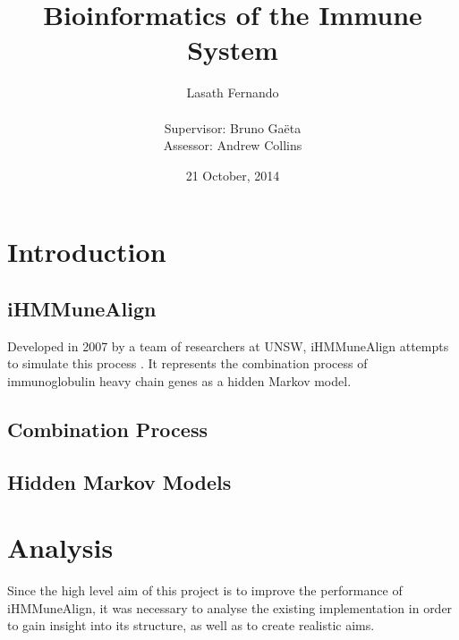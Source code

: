 \documentclass[a4paper,12pt]{report}
\author{Lasath Fernando\\\\
Supervisor: Bruno Ga\"{e}ta\\
Assessor: Andrew Collins}
\title{Bioinformatics of the Immune System}
\date{21 October, 2014}
\begin{document}
\maketitle

\tableofcontents

\chapter{Introduction}

\section{iHMMuneAlign}
Developed in 2007 by a team of researchers at UNSW, iHMMuneAlign attempts to simulate this process \autocite{iHMMuneAlign}.
It represents the combination process of immunoglobulin heavy chain genes as a hidden Markov model.

\section{Combination Process}
\section{Hidden Markov Models}

\chapter{Analysis}
Since the high level aim of this project is to improve the performance of iHMMuneAlign, it was necessary to analyse the existing implementation in order to gain insight into its structure, as well as to create realistic aims.
\end{document}
